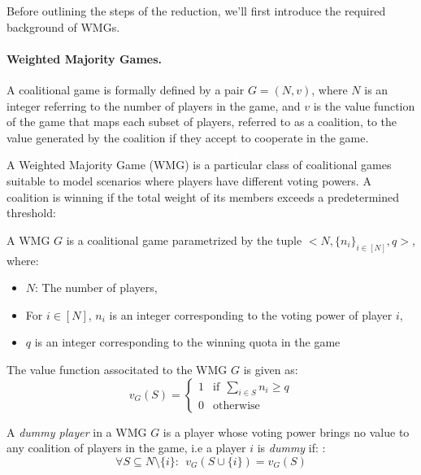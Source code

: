 Before outlining the steps of the reduction, we'll first introduce the required background of WMGs. 

\paragraph{Weighted Majority Games.} A coalitional game is formally defined by a pair $G = (N,v)$, where $N$ is an integer referring to the number of players in the game, and $v$ is the value function of the game that maps each subset of players, referred to as a coalition, to the value generated by the coalition if they accept to cooperate in the game.  

A Weighted Majority Game (WMG) is a particular class of coalitional games suitable to model scenarios where players have different voting powers. A coalition is winning if the total weight of its members exceeds a predetermined threshold:
\begin{definition} \label{def:wmg}
    A WMG $G$ is a coalitional game parametrized by the tuple $  <N,\{n_{i}\}_{i \in [N]}, q>$, where:
    \begin{itemize}
        \item $N$: The number of players,
        \item For $i \in [N]$, $n_{i}$ is an integer corresponding to the voting power of player $i$, 
        \item $q$ is an integer corresponding to the winning quota in the game  
    \end{itemize}
    The value function associtated to the WMG $G$ is given as:
    $$v_{G}(S) = \begin{cases}
        1 & \text{if}~~ \sum\limits_{i \in S} n_{i} \geq q \\
        0 & \text{otherwise}
    \end{cases}$$
\end{definition}


A \emph{dummy player} in a WMG $G$ is a player whose voting power brings no value to any coalition of players in the game, i.e a player $i$ is \textit{dummy} if: :
$$\forall S \subseteq N \setminus \{i\}:~~v_{G}(S \cup \{i\}) = v_{G}(S)$$

